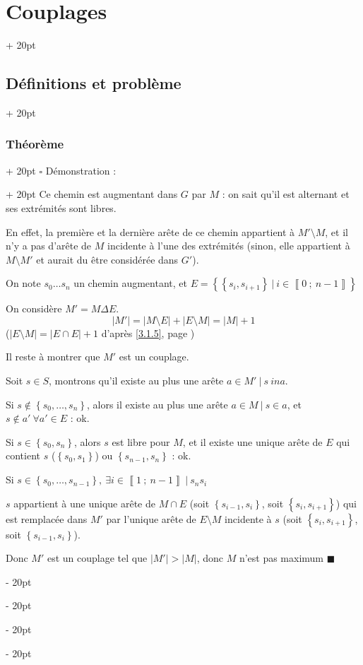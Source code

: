 \documentclass[a4paper, 12pt, twoside]{article}
\newcommand{\nset}[2]{\left\llbracket #1\ ;\ #2 \right\rrbracket}
\newcommand{\set}[1]{\left\{ #1 \right\}}
\newcommand{\abs}[1]{\left\lvert #1 \right\rvert}
\newcommand{\ind}[1][20pt]{\advance\leftskip + #1}
\newcommand{\deind}[1][20pt]{\advance\leftskip - #1}
\newenvironment{indt}[2][20pt]{#2 \par \ind[#1]}{\par \deind} %
\newenvironment{proof}[1][{Démonstration :}]{\begin{indt}{$\square$ #1}}{$\blacksquare$ \end{indt}}
\begin{document}
\begin{indt}{\section{Couplages}}
\begin{indt}{\subsection{Définitions et problème}}
\begin{indt}{\subsubsection{Théorème}}
\begin{proof}
                    Ce chemin est augmentant dans $G$ par $M$ : on sait qu'il est alternant et ses extrémités sont libres.

                    En effet, la première et la dernière arête de ce chemin appartient à $M' \setminus M$, et il n'y a pas d'arête de $M$ incidente à l'une des extrémités (sinon, elle appartient à $M \setminus M'$ et aurait du être considérée dans $G'$).

                    \vspace{12pt}
                    
                    \boxed{\Leftarrow} On note $s_0 \ldots s_n$ un chemin augmentant, et $E = \set{\set{s_i, s_{i + 1}}\ |\ i \in \nset 0 {n - 1}}$

                    On considère $M' = M \Delta E$.
                    \[
                        \abs{M'} = \abs{M \setminus E} + \abs{E \setminus M} = \abs{M} + 1
                    \]
                    ($\abs{E \setminus M} = \abs{E \cap E} + 1$ d'après \ref{3.1.5}, page \pageref{3.1.5})

                    Il reste à montrer que $M'$ est un couplage.

                    Soit $s \in S$, montrons qu'il existe au plus une arête $a \in M'\ |\ s \ ina$.

                    Si $s \notin \set{s_0, \ldots, s_n}$, alors il existe au plus une arête $a \in M\ |\ s \in a$, et $s \notin a'\ \forall a' \in E$ : ok.

                    Si $s \in \set{s_0, s_n}$, alors $s$ est libre pour $M$, et il existe une unique arête de $E$ qui contient $s$ ($\set{s_0, s_1}$) ou $\set{s_{n - 1}, s_n}$ : ok.

                    Si $s \in \set{s_0, \ldots, s_{n - 1}},\ \exists i \in \nset 1 {n - 1}\ |\ s_n s_i$

                    $s$ appartient à une unique arête de $M \cap E$ (soit $\set{s_{i - 1}, s_i}$, soit $\set{s_i, s_{i + 1}}$) qui est remplacée dans $M'$ par l'unique arête de $E \setminus M$ incidente à $s$ (soit $\set{s_i, s_{i + 1}}$, soit $\set{s_{i - 1}, s_i}$).

                    Donc $M'$ est un couplage tel que $\abs{M'} > \abs{M}$, donc $M$ n'est pas maximum
                \end{proof}
            \end{indt}
        \end{indt}

        \vspace{12pt}
        

\end{indt}
\end{document}
